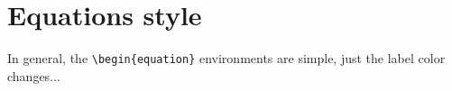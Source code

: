 \section{Equations style}
    In general, the \verb|\begin{equation}| environments are simple, just the label color changes...

